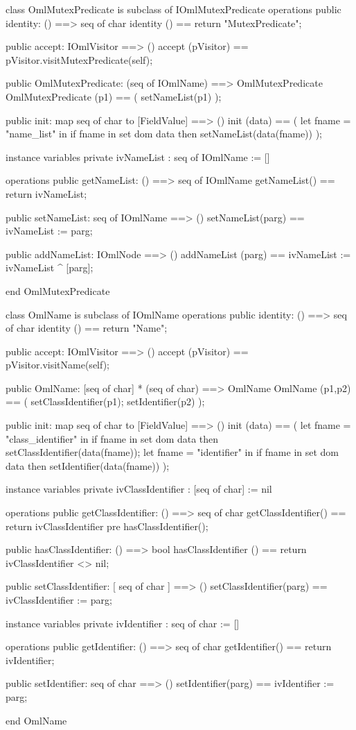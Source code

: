 \begin{vdm_al}
class OmlMutexPredicate is subclass of IOmlMutexPredicate
operations
  public identity: () ==> seq of char
  identity () == return "MutexPredicate";

  public accept: IOmlVisitor ==> ()
  accept (pVisitor) == pVisitor.visitMutexPredicate(self);

  public OmlMutexPredicate:
      (seq of IOmlName) ==> OmlMutexPredicate
  OmlMutexPredicate (p1) == 
   ( setNameList(p1) );

  public init: map seq of char to [FieldValue] ==> ()
  init (data) ==
    ( let fname = "name_list" in
        if fname in set dom data
        then setNameList(data(fname)) );

instance variables
  private ivNameList : seq of IOmlName := []

operations
  public getNameList: () ==> seq of IOmlName
  getNameList() == return ivNameList;

  public setNameList: seq of IOmlName ==> ()
  setNameList(parg) == ivNameList := parg;

  public addNameList: IOmlNode ==> ()
  addNameList (parg) == ivNameList := ivNameList ^ [parg];

end OmlMutexPredicate
\end{vdm_al}

\begin{vdm_al}
class OmlName is subclass of IOmlName
operations
  public identity: () ==> seq of char
  identity () == return "Name";

  public accept: IOmlVisitor ==> ()
  accept (pVisitor) == pVisitor.visitName(self);

  public OmlName:
      [seq of char] *
      (seq of char) ==> OmlName
  OmlName (p1,p2) == 
   ( setClassIdentifier(p1);
     setIdentifier(p2) );

  public init: map seq of char to [FieldValue] ==> ()
  init (data) ==
    ( let fname = "class_identifier" in
        if fname in set dom data
        then setClassIdentifier(data(fname));
      let fname = "identifier" in
        if fname in set dom data
        then setIdentifier(data(fname)) );

instance variables
  private ivClassIdentifier : [seq of char] := nil

operations
  public getClassIdentifier: () ==> seq of char
  getClassIdentifier() == return ivClassIdentifier
    pre hasClassIdentifier();

  public hasClassIdentifier: () ==> bool
  hasClassIdentifier () == return ivClassIdentifier <> nil;

  public setClassIdentifier: [ seq of char ] ==> ()
  setClassIdentifier(parg) == ivClassIdentifier := parg;

instance variables
  private ivIdentifier : seq of char := []

operations
  public getIdentifier: () ==> seq of char
  getIdentifier() == return ivIdentifier;

  public setIdentifier: seq of char ==> ()
  setIdentifier(parg) == ivIdentifier := parg;

end OmlName
\end{vdm_al}


